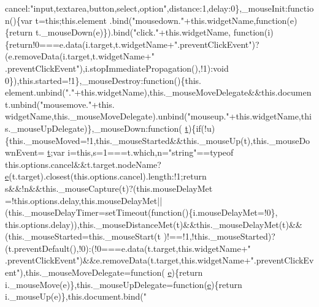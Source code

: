 \begin{DoxyCode}
      cancel:\textcolor{stringliteral}{"input,textarea,button,select,option"},distance:1,delay:0\},\_mouseInit:\textcolor{keyword}{function}()\{var t=\textcolor{keyword}{this};this.element
      .bind(\textcolor{stringliteral}{"mousedown."}+this.widgetName,\textcolor{keyword}{function}(e)\{\textcolor{keywordflow}{return} t.\_mouseDown(e)\}).bind(\textcolor{stringliteral}{"click."}+this.widgetName,\textcolor{keyword}{
      function}(i)\{\textcolor{keywordflow}{return}!0===e.data(i.target,t.widgetName+\textcolor{stringliteral}{".preventClickEvent"})?(e.removeData(i.target,t.widgetName+\textcolor{stringliteral}{"
      .preventClickEvent"}),i.stopImmediatePropagation(),!1):\textcolor{keywordtype}{void} 0\}),this.started=!1\},\_mouseDestroy:\textcolor{keyword}{function}()\{this.
      element.unbind(\textcolor{stringliteral}{"."}+this.widgetName),this.\_mouseMoveDelegate&&this.document.unbind(\textcolor{stringliteral}{"mousemove."}+this.
      widgetName,this.\_mouseMoveDelegate).unbind(\textcolor{stringliteral}{"mouseup."}+this.widgetName,this.\_mouseUpDelegate)\},\_mouseDown:\textcolor{keyword}{function}(
      \hyperlink{jquery-2_80_83_8min_8js_aaccc9105df5383111407fd5b41255e23}{t})\{\textcolor{keywordflow}{if}(!u)\{this.\_mouseMoved=!1,this.\_mouseStarted&&this.\_mouseUp(t),this.\_mouseDownEvent=
      \hyperlink{jquery-2_80_83_8min_8js_aaccc9105df5383111407fd5b41255e23}{t};var i=\textcolor{keyword}{this},s=1===t.which,n=\textcolor{stringliteral}{"string"}==typeof this.options.cancel&&t.target.nodeName?
      \hyperlink{jquery-ui_8min_8js_a2c038346d47955cbe2cb91e338edd7e1}{e}(t.target).closest(this.options.cancel).length:!1;\textcolor{keywordflow}{return} s&&!n&&this.\_mouseCapture(t)?(this.mouseDelayMet
      =!this.options.delay,this.mouseDelayMet||(this.\_mouseDelayTimer=setTimeout(\textcolor{keyword}{function}()\{i.mouseDelayMet=!0\},
      this.options.delay)),this.\_mouseDistanceMet(t)&&this.\_mouseDelayMet(t)&&(this.\_mouseStarted=this.\_mouseStart(t
      )!==!1,!this.\_mouseStarted)?(t.preventDefault(),!0):(!0===e.data(t.target,\textcolor{keyword}{this}.widgetName+\textcolor{stringliteral}{"
      .preventClickEvent"})&&e.removeData(t.target,\textcolor{keyword}{this}.widgetName+\textcolor{stringliteral}{".preventClickEvent"}),this.\_mouseMoveDelegate=\textcolor{keyword}{function}(
      \hyperlink{jquery-ui_8min_8js_a2c038346d47955cbe2cb91e338edd7e1}{e})\{\textcolor{keywordflow}{return} i.\_mouseMove(e)\},this.\_mouseUpDelegate=\textcolor{keyword}{function}(\hyperlink{jquery-ui_8min_8js_a2c038346d47955cbe2cb91e338edd7e1}{e})\{\textcolor{keywordflow}{return} i.\_mouseUp(e)\},this.document.bind(\textcolor{stringliteral}{"
}
\end{DoxyCode}
